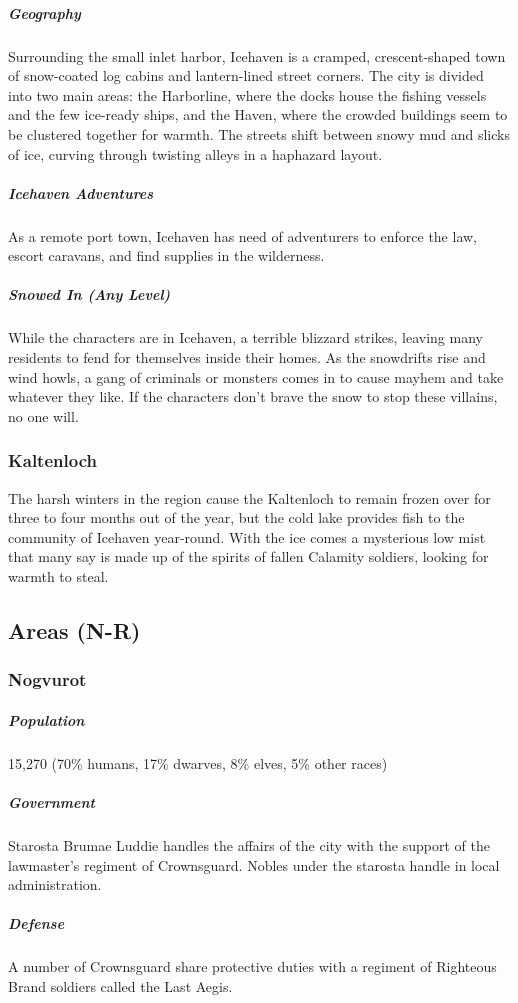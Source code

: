 \documentclass[10pt,a4paper,twoside,bg=print,twocolumn,openany,nodeprecatedcode]{dndbook}
\begin{document}
\subparagraph{Geography}
Surrounding the small inlet harbor, Icehaven is a cramped, crescent-shaped town of snow-coated log cabins and lantern-lined street corners. The city is divided into two main areas: the Harborline, where the docks house the fishing vessels and the few ice-ready ships, and the Haven, where the crowded buildings seem to be clustered together for warmth. The streets shift between snowy mud and slicks of ice, curving through twisting alleys in a haphazard layout.

\subparagraph{Icehaven Adventures}
As a remote port town, Icehaven has need of adventurers to enforce the law, escort caravans, and find supplies in the wilderness.

\subparagraph{Snowed In (Any Level)}
While the characters are in Icehaven, a terrible blizzard strikes, leaving many residents to fend for themselves inside their homes. As the snowdrifts rise and wind howls, a gang of criminals or monsters comes in to cause mayhem and take whatever they like. If the characters don't brave the snow to stop these villains, no one will.

\subsubsection{Kaltenloch}
The harsh winters in the region cause the Kaltenloch to remain frozen over for three to four months out of the year, but the cold lake provides fish to the community of Icehaven year-round. With the ice comes a mysterious low mist that many say is made up of the spirits of fallen Calamity soldiers, looking for warmth to steal.

\subsection{Areas (N-R)}
\subsubsection{Nogvurot}
\subparagraph{Population}
15,270 (70\% humans, 17\% dwarves, 8\% elves, 5\% other races)

\subparagraph{Government}
Starosta Brumae Luddie handles the affairs of the city with the support of the lawmaster's regiment of Crownsguard. Nobles under the starosta handle in local administration.

\subparagraph{Defense}
A number of Crownsguard share protective duties with a regiment of Righteous Brand soldiers called the Last Aegis.
\end{document}
